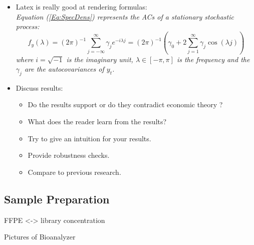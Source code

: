 \begin{itemize}
\item Latex is really good at rendering formulas:\\
{\it Equation (\ref{Eq:SpecDens}) represents the ACs of a stationary
stochastic process:
\begin{equation}
f_y(\lambda) = (2\pi)^{-1} \sum_{j=-\infty}^{\infty}
\gamma_j e^{-i\lambda j}
=(2\pi)^{-1}\left(\gamma_0 + 2 \sum_{j=1}^{\infty}
\gamma_j \cos(\lambda j)\right)
            \label{Eq:SpecDens}
\end{equation}
where $i=\sqrt{-1}$ is the imaginary unit, $\lambda \in [-\pi,
\pi]$ is the frequency and the $\gamma_j$ are the autocovariances
of $y_t$.}

\newpage

\item Discuss results:
\begin{itemize}
\item Do the results support or do they contradict economic theory ?
\item What does the reader learn from the results?
\item Try to give an intuition for your results.
\item Provide robustness checks.
\item Compare to previous research.
\end{itemize}
\end{itemize}

\subsection{Sample Preparation}
FFPE <-> library concentration

Pictures of Bioanalyzer


